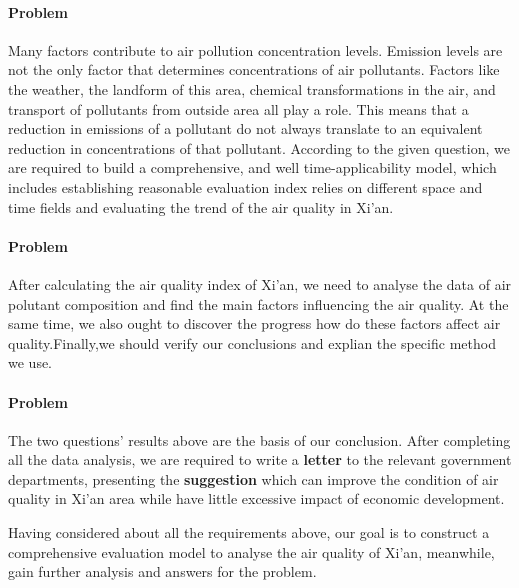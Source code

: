 \documentclass[a4paper,11pt]{article}
\begin{document}
\paragraph{Problem \uppercase\expandafter{}}Many factors contribute to air pollution concentration levels. Emission levels are not the only factor that determines concentrations of air pollutants. Factors like the weather, the landform of this area, chemical transformations in the air, and transport of pollutants from outside area all play a role. This means that a reduction in emissions of a pollutant do not always translate to an equivalent reduction in concentrations of that pollutant. According to the given question, we are required to build a comprehensive, and well time-applicability model, which includes establishing reasonable evaluation index relies on different space and time fields and evaluating the trend of the air quality in Xi'an.

\paragraph{Problem \uppercase\expandafter{}}After calculating the air quality index of Xi'an, we need to analyse the data of air polutant composition and find the main factors influencing the air quality. At the same time, we also ought to discover the progress how  do these factors affect air quality.Finally,we should verify our conclusions and explian the specific method we use.

\paragraph{Problem \uppercase\expandafter{}}
The two questions' results above are the basis of our conclusion. After completing all the data analysis, we are required to write a \textbf{letter} to the relevant government departments, presenting the \textbf{suggestion} which can improve the condition of air quality in Xi'an area while have little excessive impact of economic development.
\par Having considered about all the requirements above, our goal is to construct a comprehensive evaluation model to analyse the air quality of Xi'an, meanwhile, gain further analysis and answers for the problem. 
\end{document}
